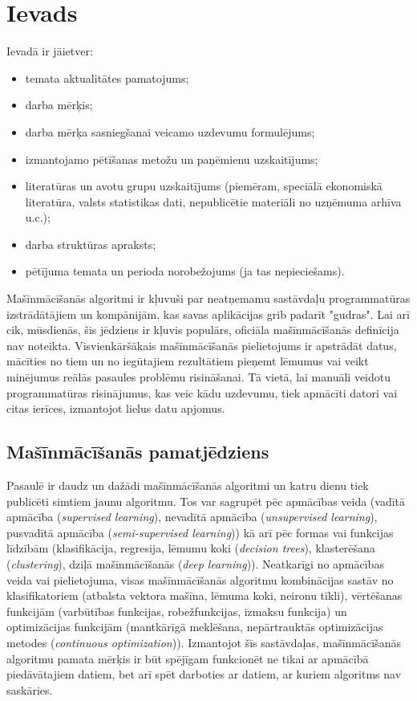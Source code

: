 \chapter{Ievads}
Ievadā ir jāietver:

\begin{itemize}
\item temata aktualitātes pamatojums;
\item darba mērķis;
\item darba mērķa sasniegšanai veicamo uzdevumu formulējums;
\item izmantojamo pētīšanas metožu un paņēmienu uzskaitījums;
\item literatūras un avotu grupu uzskaitījums (piemēram, speciālā ekonomiskā literatūra, valsts statistikas dati, nepublicētie materiāli no uzņēmuma arhīva u.c.);
\item darba struktūras apraksts;
\item pētījuma temata un perioda norobežojums (ja tas nepieciešams).
\end{itemize}

Mašīnmācīšanās algoritmi ir kļuvuši par neatņemamu sastāvdaļu programmatūras izstrādātājiem un kompānijām, kas savas aplikācijas grib padarīt "gudras". Lai arī cik, mūsdienās, šis jēdziens ir kļuvis populārs, oficiāla mašīnmācīšanās definīcija nav noteikta. Visvienkāršākais mašīnmācīšanās pielietojums ir apstrādāt datus, mācīties no tiem un no iegūtajiem rezultātiem pieņemt lēmumus vai veikt minējumus reālās pasaules problēmu risināšanai. Tā vietā, lai manuāli veidotu programmatūras risinājumus, kas veic kādu uzdevumu, tiek apmācīti datori vai citas ierīces, izmantojot lielus datu apjomus. 
\section{Mašīnmācīšanās pamatjēdziens}
Pasaulē ir daudz un dažādi mašīnmācīšanās algoritmi un katru dienu tiek publicēti simtiem jaunu algoritmu. Tos var sagrupēt pēc apmācības veida (vadītā apmācība (\textit{supervised learning}), nevadītā apmācība (\textit{unsupervised learning}), pusvadītā apmācība (\textit{semi-supervised learning})) kā arī pēc formas vai funkcijas līdzībām (klasifikācija, regresija, lēmumu koki (\textit{decision trees}), klasterēšana (\textit{clustering}), dziļā mašīnmācīšanās (\textit{deep learning})). Neatkarīgi no apmācības veida vai pielietojuma, visas mašīnmācīšanās algoritmu kombinācijas sastāv no klasifikatoriem (atbalsta vektora mašīna, lēmuma koki, neironu tīkli), vērtēšanas funkcijām (varbūtības funkcijas, robežfunkcijas, izmaksu funkcija) un optimizācijas funkcijām (mantkārīgā meklēšana, nepārtrauktās optimizācijas metodes (\textit{continuous optimization})). Izmantojot šīs sastāvdaļas, mašīnmācīšanās algoritmu pamata mērķis ir būt spējīgam funkcionēt ne tikai ar apmācībā piedāvātajiem datiem, bet arī spēt darboties ar datiem, ar kuriem algoritms nav saskāries. 

